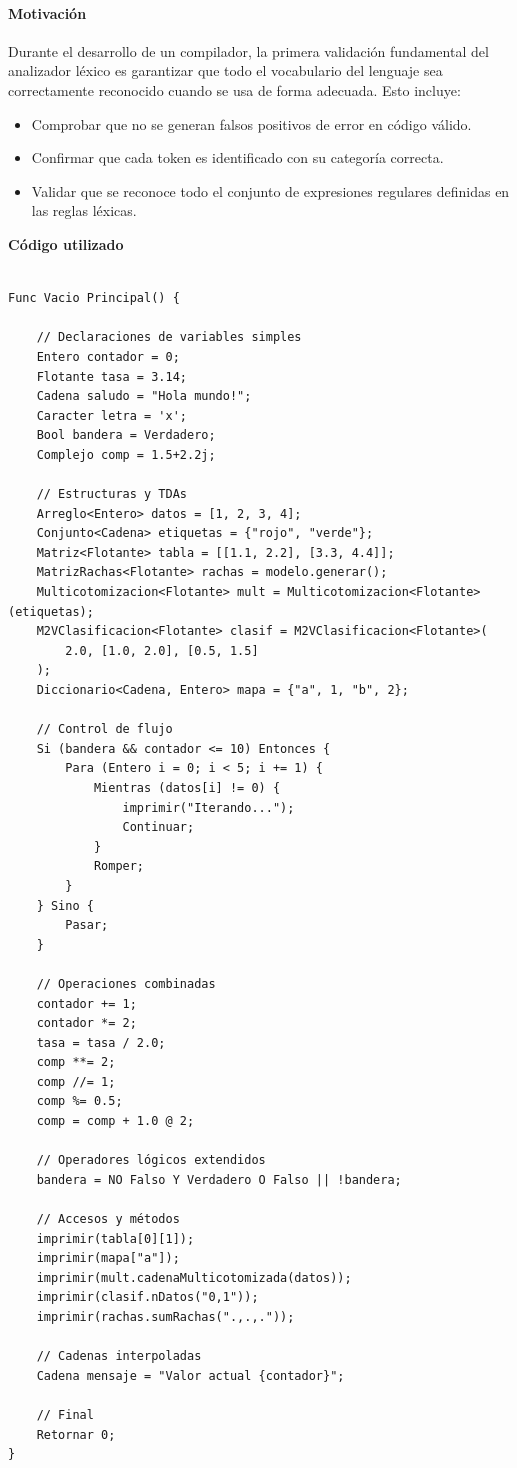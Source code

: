 \documentclass{article}
\begin{document}
\paragraph{Motivación}

Durante el desarrollo de un compilador, la primera validación fundamental del analizador léxico es garantizar que todo el vocabulario del lenguaje sea correctamente reconocido cuando se usa de forma adecuada. Esto incluye:

\begin{itemize}
  \item Comprobar que no se generan falsos positivos de error en código válido.
  \item Confirmar que cada token es identificado con su categoría correcta.
  \item Validar que se reconoce todo el conjunto de expresiones regulares definidas en las reglas léxicas.
\end{itemize}

\textbf{Código utilizado}

\begin{lstlisting}[style=mypython, caption={Programa completo con todas las categorías léxicas}]
  
Func Vacio Principal() {

    // Declaraciones de variables simples
    Entero contador = 0;
    Flotante tasa = 3.14;
    Cadena saludo = "Hola mundo!";
    Caracter letra = 'x';
    Bool bandera = Verdadero;
    Complejo comp = 1.5+2.2j;

    // Estructuras y TDAs
    Arreglo<Entero> datos = [1, 2, 3, 4];
    Conjunto<Cadena> etiquetas = {"rojo", "verde"};
    Matriz<Flotante> tabla = [[1.1, 2.2], [3.3, 4.4]];
    MatrizRachas<Flotante> rachas = modelo.generar();
    Multicotomizacion<Flotante> mult = Multicotomizacion<Flotante>(etiquetas);
    M2VClasificacion<Flotante> clasif = M2VClasificacion<Flotante>(
        2.0, [1.0, 2.0], [0.5, 1.5]
    );
    Diccionario<Cadena, Entero> mapa = {"a", 1, "b", 2};

    // Control de flujo
    Si (bandera && contador <= 10) Entonces {
        Para (Entero i = 0; i < 5; i += 1) {
            Mientras (datos[i] != 0) {
                imprimir("Iterando...");
                Continuar;
            }
            Romper;
        }
    } Sino {
        Pasar;
    }

    // Operaciones combinadas
    contador += 1;
    contador *= 2;
    tasa = tasa / 2.0;
    comp **= 2;
    comp //= 1;
    comp %= 0.5;
    comp = comp + 1.0 @ 2;

    // Operadores lógicos extendidos
    bandera = NO Falso Y Verdadero O Falso || !bandera;

    // Accesos y métodos
    imprimir(tabla[0][1]);
    imprimir(mapa["a"]);
    imprimir(mult.cadenaMulticotomizada(datos));
    imprimir(clasif.nDatos("0,1"));
    imprimir(rachas.sumRachas(".,.,."));

    // Cadenas interpoladas
    Cadena mensaje = "Valor actual {contador}";

    // Final
    Retornar 0;
}

\end{lstlisting}
\end{document}
